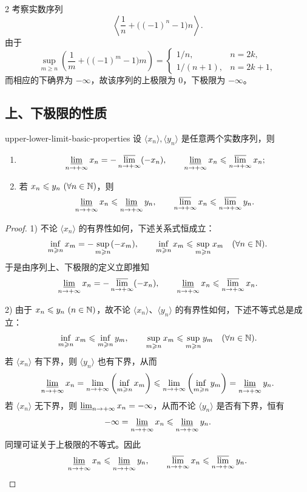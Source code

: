 \begin{sourceexample}{2}
考察实数序列
\[
\left\langle\frac1n+\bigl((-1)^n-1\bigr)n\right\rangle.
\]
由于
\[
\sup_{m\geqslant n}\left(\frac1m+\bigl((-1)^m-1\bigr)m\right)
=\begin{cases}
  1/n,&n=2k,\\
  1/(n+1),&n=2k+1,
\end{cases}
\]
而相应的下确界为 \(-\infty\)，故该序列的上极限为 \(0\)，下极限为
\(-\infty\)。
\end{sourceexample}

\subsection{上、下极限的性质}

\begin{mythm}{}{upper-lower-limit-basic-properties}
设 \(\langle x_n\rangle,\langle y_n\rangle\) 是任意两个实数序列，则
\begin{enumerate}[label=\arabic*)]
  \item
  \[
  \varliminf_{n\to+\infty}x_n
  =-\varlimsup_{n\to+\infty}(-x_n),\qquad
  \varliminf_{n\to+\infty}x_n
  \leqslant\varlimsup_{n\to+\infty}x_n;
  \]
  \item 若 \(x_n\leqslant y_n\ (\forall n\in\mathbb{N})\)，则
  \[
  \varliminf_{n\to+\infty}x_n
  \leqslant\varliminf_{n\to+\infty}y_n,\qquad
  \varlimsup_{n\to+\infty}x_n
  \leqslant\varlimsup_{n\to+\infty}y_n.
  \]
\end{enumerate}
\end{mythm}

\begin{proof}
1) 不论 \(\langle x_n\rangle\) 的有界性如何，下述关系式恒成立：
\[
\inf_{m\geqslant n}x_m=-\sup_{m\geqslant n}(-x_m),\qquad
\inf_{m\geqslant n}x_m\leqslant\sup_{m\geqslant n}x_m
\quad(\forall n\in\mathbb{N}).
\]
于是由序列上、下极限的定义立即推知
\[
\varliminf_{n\to+\infty}x_n
=-\varlimsup_{n\to+\infty}(-x_n),\qquad
\varliminf_{n\to+\infty}x_n
\leqslant\varlimsup_{n\to+\infty}x_n.
\]

2) 由于 \(x_n\leqslant y_n\ (n\in\N)\)，故不论
\(\langle x_n\rangle\)、\(\langle y_n\rangle\) 的有界性如何，下述不等式总是成立：
\[
\inf_{m\geqslant n}x_m\leqslant\inf_{m\geqslant n}y_m,
\qquad
\sup_{m\geqslant n}x_m\leqslant\sup_{m\geqslant n}y_m
\quad(\forall n\in\mathbb{N}).
\]
若 \(\langle x_n\rangle\) 有下界，则 \(\langle y_n\rangle\) 也有下界，从而
\[
\varliminf_{n\to+\infty}x_n
=\lim_{n\to+\infty}\left(\inf_{m\geqslant n}x_m\right)
\leqslant
\lim_{n\to+\infty}\left(\inf_{m\geqslant n}y_m\right)
=\varliminf_{n\to+\infty}y_n.
\]
若 \(\langle x_n\rangle\) 无下界，则
\(\varliminf_{n\to+\infty}x_n=-\infty\)，从而不论
\(\langle y_n\rangle\) 是否有下界，恒有
\[
-\infty=\varliminf_{n\to+\infty}x_n
\leqslant\varliminf_{n\to+\infty}y_n.
\]
同理可证关于上极限的不等式。因此
\[
\varliminf_{n\to+\infty}x_n
\leqslant\varliminf_{n\to+\infty}y_n,\qquad
\varlimsup_{n\to+\infty}x_n
\leqslant\varlimsup_{n\to+\infty}y_n.
\]
\end{proof}

